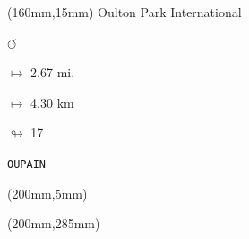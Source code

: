 \begin{textblock*}{40mm}(160mm,15mm)%
Oulton Park International
\par \Huge$\circlearrowleft$
\Large
\par$\mapsto$ 2.67 mi.
\par$\mapsto$ 4.30 km
\par$\looparrowright$ 17
\par\hfill\tiny\tt OUPAIN\\
\end{textblock*}
\begin{textblock*}{20mm}(200mm,5mm)%
\fbox{\thepage}
\end{textblock*}
\begin{textblock*}{20mm}(200mm,285mm)%
\fbox{\thepage}
\end{textblock*}
\null\newpage

